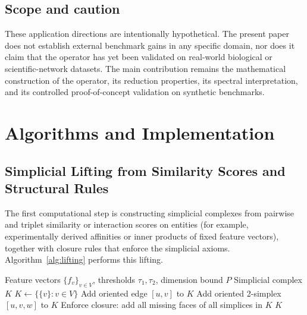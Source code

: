 \documentclass[11pt]{article}
\theoremstyle{definition}
\theoremstyle{remark}
\DeclareMathOperator{\simop}{sim}
\DeclareMathOperator{\tri}{tri}
\begin{document}
\subsection{Scope and caution}

These application directions are intentionally hypothetical. The present paper does not establish external benchmark gains in any specific domain, nor does it claim that the operator has yet been validated on real-world biological or scientific-network datasets. The main contribution remains the mathematical construction of the operator, its reduction properties, its spectral interpretation, and its controlled proof-of-concept validation on synthetic benchmarks.


\section{Algorithms and Implementation}
\label{sec:algorithms}

\subsection{Simplicial Lifting from Similarity Scores and Structural Rules}

The first computational step is constructing simplicial complexes from pairwise and triplet similarity or interaction scores on entities (for example, experimentally derived affinities or inner products of fixed feature vectors), together with closure rules that enforce the simplicial axioms.
Algorithm~\ref{alg:lifting} performs this lifting.

\begin{algorithm}[h]
\caption{Simplicial Lifting}
\label{alg:lifting}
\begin{algorithmic}[1]
\Require Feature vectors $\{f_v\}_{v\in V}$, thresholds $\tau_1,\tau_2$, dimension bound $P$
\Ensure Simplicial complex $K$
\State $K \gets \{\{v\}:v\in V\}$ 
  \If{$\simop(f_u,f_v) > \tau_1$}
    \State Add oriented edge $[u,v]$ to $K$
  \EndIf
\EndFor
{}
  \If{$\tri(f_u,f_v,f_w)>\tau_2$ \textbf{and} $[u,v],[u,w],[v,w]\in K$}
    \State Add oriented 2-simplex $[u,v,w]$ to $K$
  \EndIf
\EndFor
\State Enforce closure: add all missing faces of all simplices in $K$
\State \Return $K$
\end{algorithmic}
\end{algorithm}
\end{document}

